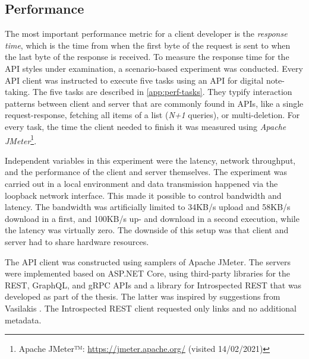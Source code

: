\subsection{Performance}\label{subsec:performance}
The most important performance metric for a client developer is the \emph{response time}, which is the time from when the first byte of the request is sent to when the last byte of the response is received. To measure the response time for the API styles under examination, a scenario-based experiment was conducted. Every API client was instructed to execute five tasks using an API for digital note-taking. The five tasks are described in \cref{app:perf-tasks}. They typify interaction patterns between client and server that are commonly found in APIs, like a single request-response, fetching all items of a list (\textit{N+1} queries), or multi-deletion. For every task, the time the client needed to finish it was measured using \textit{Apache JMeter}\footnote{Apache JMeter™: \url{https://jmeter.apache.org/} (visited 14/02/2021)}.

Independent variables in this experiment were the latency, network throughput, and the performance of the client and server themselves. The experiment was carried out in a local environment and data transmission happened via the loopback network interface. This made it possible to control bandwidth and latency. The bandwidth was artificially limited to 34KB/s upload and 58KB/s download in a first, and 100KB/s up- and download in a second execution, while the latency was virtually zero. The downside of this setup was that client and server had to share hardware resources.

The API client was constructed using samplers of Apache JMeter. The servers were implemented based on ASP.NET Core, using third-party libraries for the REST, GraphQL, and gRPC APIs and a library for Introspected REST that was developed as part of the thesis. The latter was inspired by suggestions from Vasilakis \autocite[ch.~10]{Vasilakis2017}. The Introspected REST client requested only links and no additional metadata.

